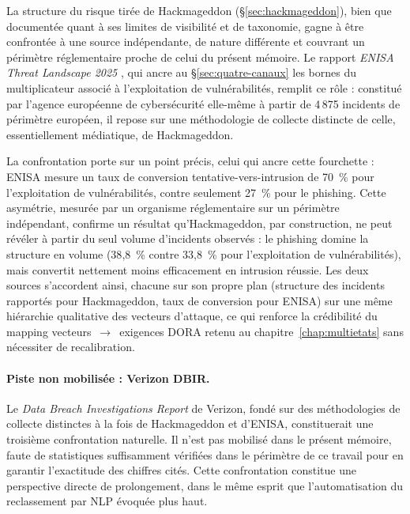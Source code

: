 La structure du risque tirée de Hackmageddon (\S\ref{sec:hackmageddon}), bien que
documentée quant à ses limites de visibilité et de taxonomie, gagne à être
confrontée à une source indépendante, de nature différente et couvrant un
périmètre réglementaire proche de celui du présent mémoire. Le rapport
\emph{ENISA Threat Landscape 2025} \citep{enisa2025}, qui ancre au \S\ref{sec:quatre-canaux} les
bornes du multiplicateur associé à l'exploitation de vulnérabilités, remplit
ce rôle : constitué par l'agence européenne de cybersécurité elle-même à
partir de 4\,875 incidents de périmètre européen, il repose sur une
méthodologie de collecte distincte de celle, essentiellement médiatique, de
Hackmageddon.

La confrontation porte sur un point précis, celui qui ancre cette fourchette : ENISA
mesure un taux de conversion tentative-vers-intrusion de 70~\% pour
l'exploitation de vulnérabilités, contre seulement 27~\% pour le phishing.
Cette asymétrie, mesurée par un organisme réglementaire sur un périmètre
indépendant, confirme un résultat qu'Hackmageddon, par construction, ne peut
révéler à partir du seul volume d'incidents observés : le phishing domine la
structure en volume (38{,}8~\% contre 33{,}8~\% pour l'exploitation de
vulnérabilités), mais convertit nettement moins efficacement en
intrusion réussie. Les deux sources s'accordent ainsi, chacune sur son propre
plan (structure des incidents rapportés pour Hackmageddon, taux de
conversion pour ENISA) sur une même hiérarchie qualitative des vecteurs
d'attaque, ce qui renforce la crédibilité du mapping vecteurs~$\rightarrow$~exigences
DORA retenu au chapitre~\ref{chap:multietats} sans nécessiter de recalibration.

\paragraph{Piste non mobilisée : Verizon DBIR.} Le \emph{Data Breach
Investigations Report} de Verizon, fondé sur des méthodologies de collecte
distinctes à la fois de Hackmageddon et d'ENISA, constituerait une troisième
confrontation naturelle. Il n'est pas mobilisé dans le présent mémoire, faute
de statistiques suffisamment vérifiées dans le périmètre de ce travail pour
en garantir l'exactitude des chiffres cités. Cette confrontation constitue une
perspective directe de prolongement, dans le même esprit que l'automatisation
du reclassement par NLP évoquée plus haut.

